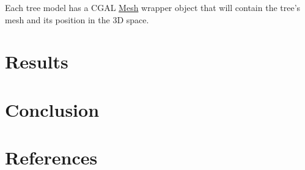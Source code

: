 \documentclass[12pt]{article}
\begin{document}
Each tree model has a CGAL \href{https://doc.cgal.org/latest/Surface_mesh/classCGAL_1_1Surface__mesh.html}{Mesh}
wrapper object that will contain the tree's
mesh and its position in the 3D space.

\section{Results}


\newpage

\section{Conclusion}


\newpage

\section{References}


\end{document}
